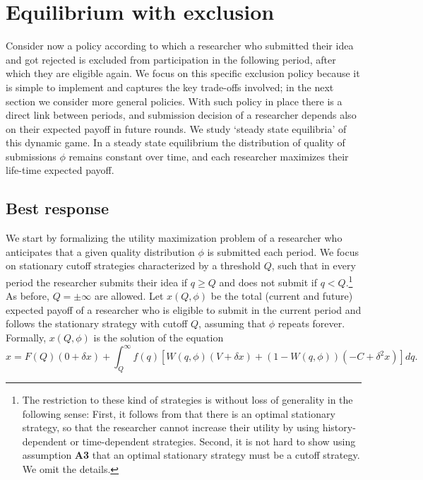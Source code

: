 \documentclass[12pt]{article}
\theoremstyle{plain}
\theoremstyle{definition}
\theoremstyle{remark}
\begin{document}

\section{Equilibrium with exclusion}\label{sec-steady-states-conditional}

Consider now a policy according to which a researcher who submitted their idea and got rejected is excluded from participation in the following period, after which they are eligible again. We focus on this specific exclusion policy because it is simple to implement and captures the key trade-offs involved; in the next section we consider more general policies. With such policy in place there is a direct link between periods, and submission decision of a researcher depends also on their expected payoff in future rounds. We study `steady state equilibria' of this dynamic game. In a steady state equilibrium the distribution of quality of submissions $\phi$ remains constant over time, and each researcher maximizes their life-time expected payoff.

\subsection{Best response}
We start by formalizing the utility maximization problem of a researcher who anticipates that a given quality distribution $\phi$ is submitted each period. We focus on stationary cutoff strategies characterized by a threshold $Q$, such that in every period the researcher submits their idea if $q\ge Q$ and does not submit if $q<Q$.\footnote{The restriction to these kind of strategies is without loss of generality in the following sense: First, it follows from \citet[Theorem 7]{blackwell1965discounted} that there is an optimal stationary strategy, so that the researcher cannot increase their utility by using history-dependent or time-dependent strategies. Second, it is not hard to show using assumption \textbf{A3} that an optimal stationary strategy must be a cutoff strategy. We omit the details.} As before, $Q=\pm\infty$ are allowed. Let $x(Q,\phi)$ be the total (current and future) expected payoff of a researcher who is eligible to submit in the current period and follows the stationary strategy with cutoff $Q$, assuming that $\phi$ repeats forever. Formally, $x(Q,\phi)$ is the solution of the equation
\begin{equation}\label{eqn-steady-state-payoff}
    x = F(Q)(0+\delta x) + \int_Q^{\infty} f(q)\left[W(q,\phi)(V+\delta x) + (1-W(q,\phi))(-C+\delta^2 x) \right] dq.
\end{equation}    
\end{document}
